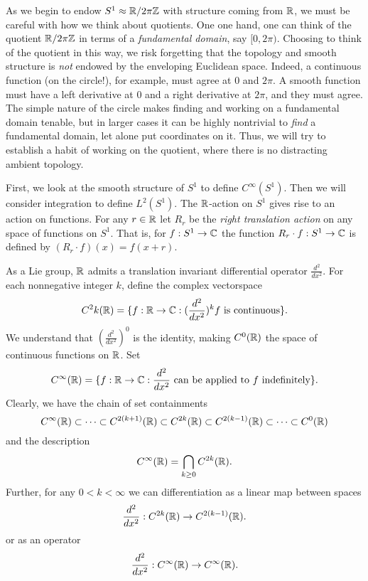 \documentclass[12pt]{amsart}
\newcommand{\der}{\frac{d^2}{dx^2}}
\begin{document}
	As we begin to endow $S^1\approx \mathbb{R}/2\pi \mathbb{Z}$ with structure coming from $\mathbb{R}$, we must be careful with how we think about quotients. One one hand, one can think of the quotient $\mathbb{R}/2\pi \mathbb{Z}$ in terms of a \emph{fundamental domain}, say $[0,2\pi)$. Choosing to think of the quotient in this way, we risk forgetting that the topology and smooth structure is \emph{not} endowed by the enveloping Euclidean space. Indeed, a continuous function (on the circle!), for example, must agree at $0$ and $2\pi$. A smooth function must have a left derivative at $0$ and a right derivative at $2\pi$, and they must agree. The simple nature of the circle makes finding and working on a fundamental domain tenable, but in larger cases it can be highly nontrivial to \emph{find} a fundamental domain, let alone put coordinates on it. Thus, we will try to establish a habit of working on the quotient, where there is no distracting ambient topology.
	
	First, we look at the smooth structure of $S^1$ to define $C^\infty(S^1)$. Then we will consider integration to define $L^2(S^1)$.  The $\mathbb{R}$-action on $S^1$ gives rise to an action on functions. For any $r\in \mathbb{R}$ let $R_r$ be the \emph{right translation action} on any space of functions on $S^1$. That is, for $f:S^1\to \mathbb{C}$ the function $R_r\cdot f:S^1 \to \mathbb{C}$ is defined by $(R_r \cdot f)(x)=f(x+r)$.
	
	As a Lie group, $\mathbb{R}$ admits a translation invariant differential operator $\frac{d^2}{dx^2}$. For each nonnegative integer $k$, define the complex vectorspace
		\begin{equation*}
			C^2k (\R)=\{ f:\R \to \C: (\der)^kf \text{ is continuous} \}.
		\end{equation*}
	We understand that $(\der)^0$ is the identity, making $C^0(\mathbb{R})$ the space of continuous functions on $\mathbb{R}$. Set
		\begin{equation*}
			C^\infty (\R)=\{ f:\R \to \C: \der \text{ can be applied to $f$ indefinitely} \}.
		\end{equation*}
	Clearly, we have the chain of set containments
		\begin{equation*}
			C^\infty(\mathbb{R}) \subset \cdots \subset C^{2(k+1)}(\mathbb{R}) \subset C^{2k}(\mathbb{R}) \subset C^{2(k-1)}(\mathbb{R}) \subset \cdots \subset C^0(\mathbb{R})
		\end{equation*}
	and the description
		\begin{equation*}
			C^\infty(\mathbb{R})= \bigcap_{k\geq0} C^{2k}(\mathbb{R}).
		\end{equation*}
	Further, for any $0<k<\infty$ we can differentiation as a linear map between spaces
		\begin{equation*}
			\der:C^{2k}(\R) \to C^{2(k-1)}(\R).
		\end{equation*}
	or as an operator
		\begin{equation*}
			\der:C^\infty(\R) \to C^\infty(\R).
		\end{equation*}	
		
\end{document}

